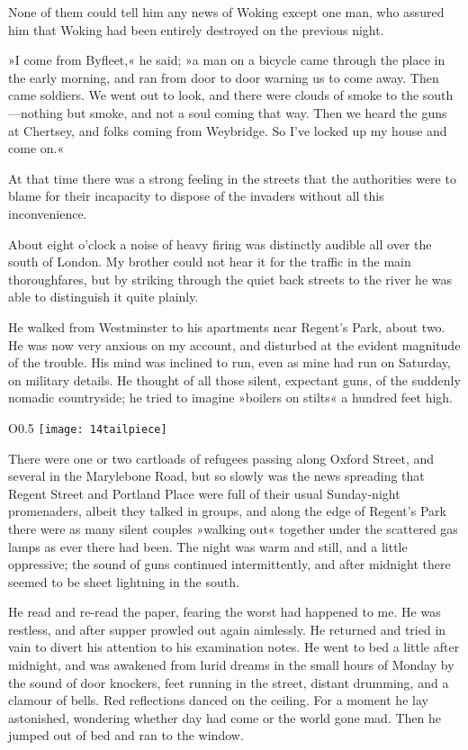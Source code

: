 None of them could tell him any news of Woking except one man, who assured him that Woking had been entirely destroyed on the previous night.

»I come from Byfleet,« he said; »a man on a bicycle came through the place in the early morning, and ran from door to door warning us to come away. Then came soldiers. We went out to look, and there were clouds of smoke to the south—nothing but smoke, and not a soul coming that way. Then we heard the guns at Chertsey, and folks coming from Weybridge. So I've locked up my house and come on.«

At that time there was a strong feeling in the streets that the authorities were to blame for their incapacity to dispose of the invaders without all this inconvenience.

About eight o'clock a noise of heavy firing was distinctly audible all over the south of London. My brother could not hear it for the traffic in the main thoroughfares, but by striking through the quiet back streets to the river he was able to distinguish it quite plainly.

He walked from Westminster to his apartments near Regent's Park,\label{brojourney8} about two. He was now very anxious on my account, and disturbed at the evident magnitude of the trouble. His mind was inclined to run, even as mine had run on Saturday, on military details. He thought of all those silent, expectant guns, of the suddenly nomadic countryside; he tried to imagine »boilers on stilts« a hundred feet high.

\begin{wrapfigure}{O}{0.5\textwidth}
\centering
\texttt{[image: 14tailpiece]}
\end{wrapfigure}

There were one or two cartloads of refugees passing along Oxford Street, and several in the Marylebone Road, but so slowly was the news spreading that Regent Street and Portland Place were full of their usual Sunday-night promenaders, albeit they talked in groups, and along the edge of Regent's Park there were as many silent couples »walking out« together under the scattered gas lamps as ever there had been. The night was warm and still, and a little oppressive; the sound of guns continued intermittently, and after midnight there seemed to be sheet lightning in the south.

He read and re-read the paper, fearing the worst had happened to me. He was restless, and after supper prowled out again aimlessly. He returned and tried in vain to divert his attention to his examination notes. He went to bed a little after midnight, and was awakened from lurid dreams in the small hours of Monday by the sound of door knockers, feet running in the street, distant drumming, and a clamour of bells. Red reflections danced on the ceiling. For a moment he lay astonished, wondering whether day had come or the world gone mad. Then he jumped out of bed and ran to the window.

